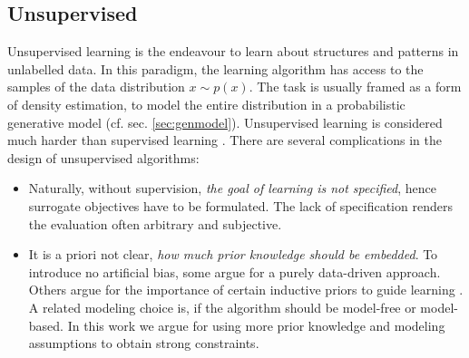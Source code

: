	\subsection{Unsupervised}\label{sec:unsupervised}
		{Unsupervised learning} is the endeavour to learn about structures and patterns in unlabelled data. In this paradigm, the learning algorithm has access to the samples of the data distribution $x \sim p(x)$. The task is usually framed as a form of density estimation, \ie to model the entire distribution in a probabilistic generative model (cf. sec. \ref{sec:genmodel}).
		Unsupervised learning is considered much harder than supervised learning \cite{bishop06pattern}. There are several complications in the design of unsupervised algorithms:
		\begin{itemize}
			\item Naturally, without supervision, \textit{the goal of learning is not specified}, hence surrogate objectives have to be formulated. The lack of specification renders the evaluation often arbitrary and subjective.
			\item It is a priori not clear, \textit{how much prior knowledge should be embedded}. To introduce no artificial bias, some argue for a purely data-driven approach. Others argue for the importance of certain inductive priors to guide learning \cite{tenenbaum18think}.
			A related modeling choice is, if the algorithm should be model-free or model-based.
			{In this work we argue for using more prior knowledge and modeling assumptions to obtain strong constraints.}

		\end{itemize}

